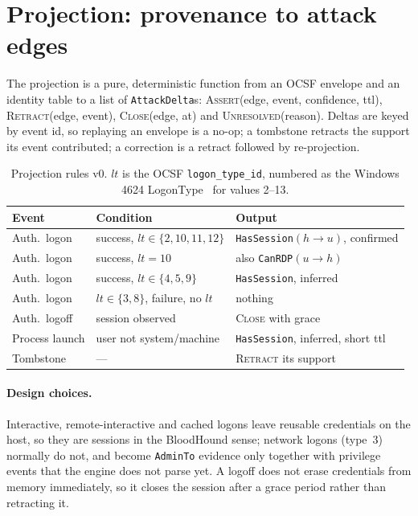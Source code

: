 \documentclass[10pt,twocolumn]{article}
\begin{document}
\section{Projection: provenance to attack edges}\label{sec:projection}

The projection is a pure, deterministic function from an OCSF envelope and an identity
table to a list of \texttt{AttackDelta}s: \textsc{Assert}(edge, event, confidence, ttl),
\textsc{Retract}(edge, event), \textsc{Close}(edge, at) and \textsc{Unresolved}(reason).
Deltas are keyed by event id, so replaying an envelope is a no-op; a tombstone retracts
the support its event contributed; a correction is a retract followed by re-projection.

\begin{table}[t]
\centering\small
\caption{Projection rules v0. $lt$ is the OCSF \texttt{logon\_type\_id}, numbered as the
Windows 4624 LogonType~\cite{mslogontype} for values 2--13.}
\label{tab:rules}
\begin{tabular}{@{}lll@{}}
\toprule
Event & Condition & Output \\
\midrule
Auth.\ logon & success, $lt\in\{2,10,11,12\}$ & \texttt{HasSession}$(h{\to}u)$, confirmed \\
Auth.\ logon & success, $lt=10$ & also \texttt{CanRDP}$(u{\to}h)$ \\
Auth.\ logon & success, $lt\in\{4,5,9\}$ & \texttt{HasSession}, inferred \\
Auth.\ logon & $lt\in\{3,8\}$, failure, no $lt$ & nothing \\
Auth.\ logoff & session observed & \textsc{Close} with grace \\
Process launch & user not system/machine & \texttt{HasSession}, inferred, short ttl \\
Tombstone & --- & \textsc{Retract} its support \\
\bottomrule
\end{tabular}
\end{table}

\paragraph{Design choices.} Interactive, remote-interactive and cached logons leave
reusable credentials on the host, so they are sessions in the BloodHound sense; network
logons (type~3) normally do not, and become \texttt{AdminTo} evidence only together with
privilege events that the engine does not parse yet. A logoff does not erase credentials
from memory immediately, so it closes the session after a grace period rather than
retracting it.
\end{document}
